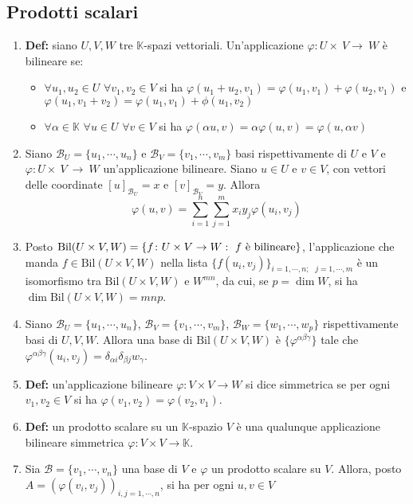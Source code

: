 \documentclass[a4paper,11pt]{article}
\begin{document}
\subsection{Prodotti scalari}
\begin{enumerate}[resume]
	\item \textbf{Def:} siano $U,V,W$ tre $\mathbb{K}$-spazi vettoriali. Un'applicazione $\varphi\colon U\times~V\to~ W$ è bilineare se:
	\begin{itemize}
		\item $\forall u_1,u_2 \in U$ $\forall v_1,v_2\in V$ si ha $\varphi(u_1+u_2,v_1)=\varphi(u_1,v_1)+\varphi(u_2,v_1)$ e $\varphi(u_1,v_1+v_2)=\varphi(u_1,v_1)+\phi(u_1,v_2)$
		\item $\forall\alpha\in\mathbb{K}$ $\forall u\in U$ $\forall v\in V$ si ha $\varphi(\alpha u,v)=\alpha\varphi(u,v)=\varphi(u,\alpha v)$
	\end{itemize}
	\item Siano $\mathcal{B}_U=\{u_1,\cdots,u_n\}$ e $\mathcal{B}_V=\{v_1,\cdots,v_m\}$ basi rispettivamente di $U$ e $V$ e $\varphi\colon U\times~ V~\to ~W$ un'applicazione bilineare. Siano $u\in U$ e $v\in V$, con vettori delle coordinate $[u]_{\mathcal{B}_U}=x$ e $[v]_{\mathcal{B}_V}=y$. Allora \[\varphi(u,v)=\sum_{i=1}^{n}\sum_{j=1}^{m}x_iy_j\varphi(u_i,v_j)\]
	\item Posto $\textmd{Bil}(U\times V,W)=\{f\colon U\times V\to W:\textrm{ $f$ è bilineare}\}$, l'applicazione che manda $f\in\textrm{Bil}(U\times V,W)$ nella lista $\{f(u_i,v_j)\}_{i=1,\cdots,n;\textrm{  }j=1,\cdots,m}$ è un isomorfismo tra $\textrm{Bil}(U\times V,W)$ e $W^{mn}$, da cui, se $p=\dim W$, si ha $\dim\textrm{Bil}(U\times V,W)=mnp$.
	\item Siano $\mathcal{B}_U=\{u_1,\cdots,u_n\}$, $\mathcal{B}_V=\{v_1,\cdots,v_m\}$, $\mathcal{B}_W=\{w_1,\cdots,w_p\}$ rispettivamente basi di $U,V,W$. Allora una base di $\textrm{Bil}(U\times V,W)$ è $\{\varphi^{\alpha\beta\gamma}\}$ tale che $\varphi^{\alpha\beta\gamma}(u_i,v_j)=\delta_{\alpha i}\delta_{\beta j}w_{\gamma}$.
	\item \textbf{Def:} un'applicazione bilineare $\varphi\colon V\times V\to W$ si dice simmetrica se  per ogni $v_1,v_2\in V$ si ha $\varphi(v_1,v_2)=\varphi(v_2,v_1)$.
	\item \textbf{Def:} un prodotto scalare su un $\mathbb{K}$-spazio $V$ è una qualunque applicazione bilineare simmetrica $\varphi\colon V\times V\to\mathbb{K}$.
	\item Sia $\mathcal{B}=\{v_1,\cdots,v_n\}$ una base di $V$ e $\varphi$ un prodotto scalare su $V$. Allora, posto $A=(\varphi(v_i,v_j))_{i,j=1,\cdots,n}$, si ha per ogni $u,v\in V$

\end{enumerate}
\end{document}
